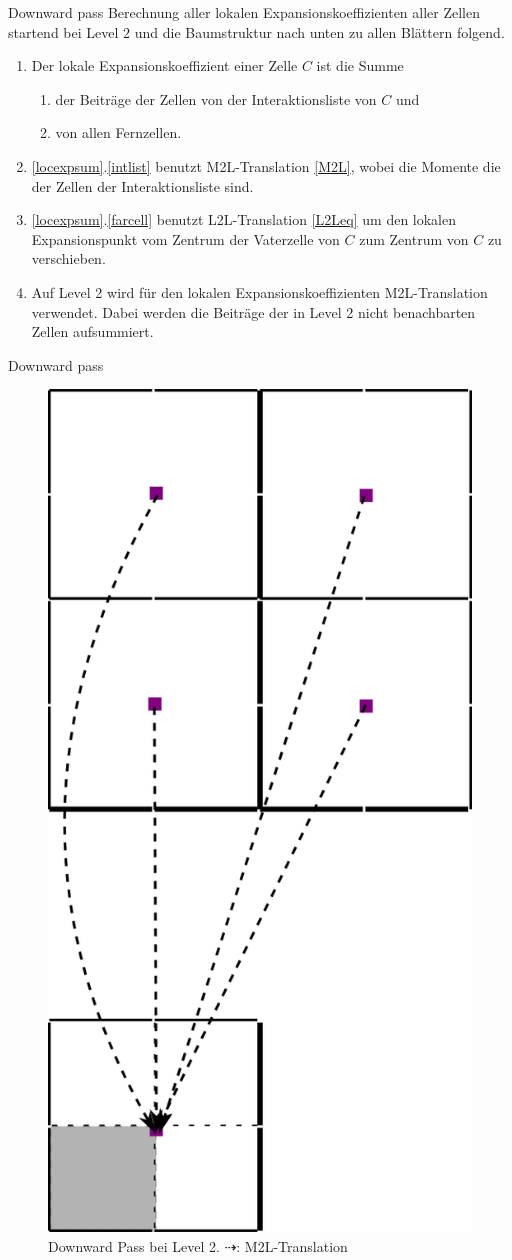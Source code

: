 \documentclass[ngerman]{beamer}
\begin{document}
\begin{frame}{Downward pass}
Berechnung aller lokalen Expansionskoeffizienten aller Zellen startend bei Level $2$ und die Baumstruktur nach unten zu allen Blättern folgend.\\
\begin{enumerate}
\item\label{locexpsum} Der lokale Expansionskoeffizient einer Zelle $C$ ist die Summe 
\begin{enumerate} 
\item\label{intlist} der Beiträge der Zellen von der Interaktionsliste von $C$ und 
\item\label{farcell} von allen Fernzellen.
\end{enumerate}
\item \ref{locexpsum}.\ref{intlist} benutzt M2L-Translation \eqref{M2L}, wobei die Momente die der Zellen der Interaktionsliste sind.
\item \ref{locexpsum}.\ref{farcell} benutzt L2L-Translation \eqref{L2Leq} um den lokalen Expansionspunkt vom Zentrum der Vaterzelle von $C$ zum Zentrum von $C$ zu verschieben.
\item Auf Level 2 wird für den lokalen Expansionskoeffizienten M2L-Translation verwendet. Dabei werden die Beiträge der in Level 2 nicht benachbarten Zellen aufsummiert. 
\end{enumerate}
\end{frame}

\begin{frame}{Downward pass}
\begin{figure}
\includegraphics[height=0.5\textwidth]{downpass1.png}
\caption{Downward Pass bei Level 2. $\dashrightarrow$: M2L-Translation}
\end{figure}
\end{frame}
\end{document}
